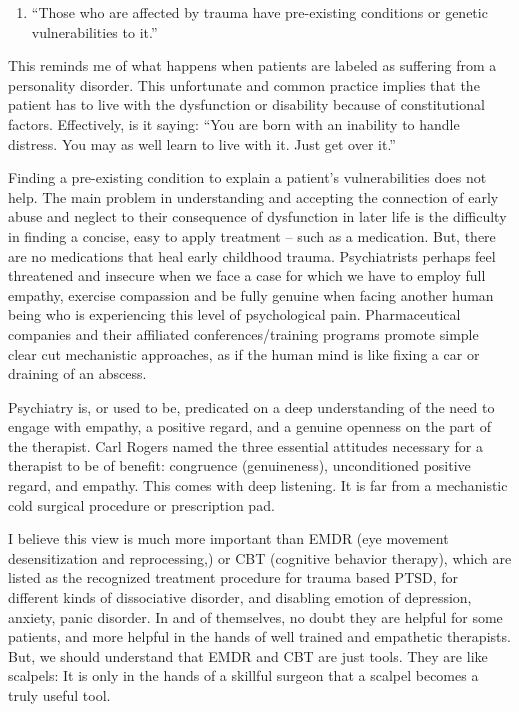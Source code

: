 \documentclass[]{book}
\providecommand{\tightlist}{%
  \setlength{\itemsep}{0pt}\setlength{\parskip}{0pt}}
\begin{document}
\begin{enumerate}
\def\labelenumi{\arabic{enumi}.}
\setcounter{enumi}{6}
\tightlist
\item
  ``Those who are affected by trauma have pre-existing conditions or genetic vulnerabilities to it.''
\end{enumerate}

This reminds me of what happens when patients are labeled as suffering from a personality disorder. This unfortunate and common practice implies that the patient has to live with the dysfunction or disability because of constitutional factors. Effectively, is it saying: ``You are born with an inability to handle distress. You may as well learn to live with it. Just get over it.''

Finding a pre-existing condition to explain a patient's vulnerabilities does not help. The main problem in understanding and accepting the connection of early abuse and neglect to their consequence of dysfunction in later life is the difficulty in finding a concise, easy to apply treatment -- such as a medication. But, there are no medications that heal early childhood trauma. Psychiatrists perhaps feel threatened and insecure when we face a case for which we have to employ full empathy, exercise compassion and be fully genuine when facing another human being who is experiencing this level of psychological pain. Pharmaceutical companies and their affiliated conferences/training programs promote simple clear cut mechanistic approaches, as if the human mind is like fixing a car or draining of an abscess.

Psychiatry is, or used to be, predicated on a deep understanding of the need to engage with empathy, a positive regard, and a genuine openness on the part of the therapist. Carl Rogers named the three essential attitudes necessary for a therapist to be of benefit: congruence (genuineness), unconditioned positive regard, and empathy. This comes with deep listening. It is far from a mechanistic cold surgical procedure or prescription pad.

I believe this view is much more important than EMDR (eye movement desensitization and reprocessing,) or CBT (cognitive behavior therapy), which are listed as the recognized treatment procedure for trauma based PTSD, for different kinds of dissociative disorder, and disabling emotion of depression, anxiety, panic disorder. In and of themselves, no doubt they are helpful for some patients, and more helpful in the hands of well trained and empathetic therapists. But, we should understand that EMDR and CBT are just tools. They are like scalpels: It is only in the hands of a skillful surgeon that a scalpel becomes a truly useful tool.
\end{document}

